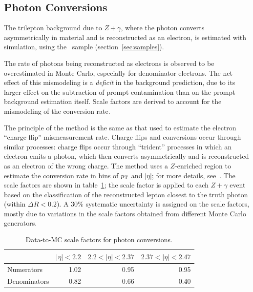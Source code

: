 \subsection{Photon Conversions}\label{sec:photon-conversions}
The trilepton background due to $Z+\gamma$, where the photon converts asymmetrically in material and is reconstructed as an electron, is estimated with simulation, using the \sherpa~sample (section~\ref{sec:samples}).

The rate of photons being reconstructed as electrons is observed to be overestimated in Monte Carlo, especially for denominator electrons. The net effect of this mismodeling is a \emph{deficit} in the background prediction, due to its larger effect on the subtraction of prompt contamination than on the prompt background estimation itself. Scale factors are derived to account for the mismodeling of the conversion rate. 

The principle of the method is the same as that used to estimate the electron ``charge flip'' mismeasurement rate. Charge flips and conversions occur through similar processes: charge flips occur through ``trident'' processes in which an electron emits a photon, which then converts asymmetrically and is reconstructed as an electron of the wrong charge. The method uses a $Z$-enriched region to estimate the conversion rate in bins of $p_{\text{T}}$ and $|\eta|$; for more details, see~\cite{DeViveiros:1670929}. The scale factors are shown in table~\ref{table:conversion-sfs}; the scale factor is applied to each $Z+\gamma$ event based on the classification of the reconstructed lepton closest to the truth photon (within $\Delta R<0.2$). A $30\%$ systematic uncertainty is assigned on the scale factors, mostly due to variations in the scale factors obtained from different Monte Carlo generators. 

\begin{table}[tbp]
  \centering
  \begin{tabular}{l r r r}
					 &$|\eta|<2.2$     &$2.2<|\eta|<2.37$     &$2.37<|\eta|<2.47$\\
	\hline
	Numerators       &1.02             &0.95                  &0.95\\
	Denominators     &0.82             &0.66                  &0.40\\
  \end{tabular}
  \caption{Data-to-MC scale factors for photon conversions.}
  \label{table:conversion-sfs}
\end{table}



